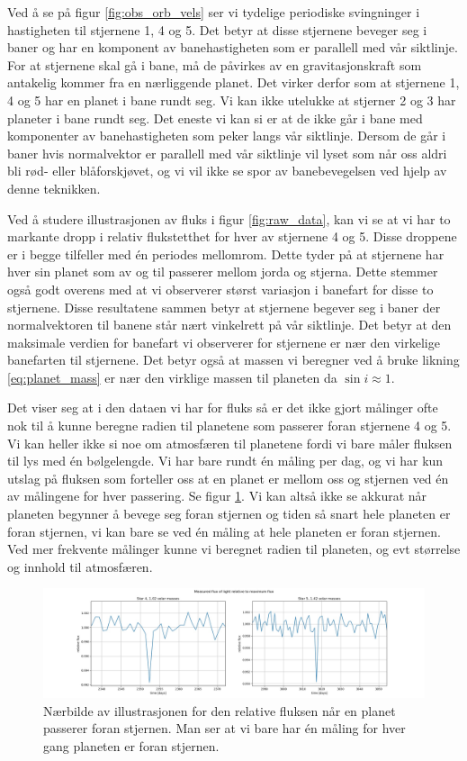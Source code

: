 \documentclass[english,notitlepage]{revtex4-1}  %
\begin{document}
Ved å se på figur \ref{fig:obs_orb_vels} ser vi tydelige periodiske svingninger i
 hastigheten til stjernene 1, 4 og 5. Det betyr at disse stjernene beveger seg i baner og
 har en komponent av banehastigheten som er parallell med vår siktlinje. For at stjernene skal gå i bane, må de påvirkes av en gravitasjonskraft som antakelig kommer fra en
 nærliggende planet. Det virker derfor som at stjernene 1, 4 og 5 har en planet i bane
 rundt seg. Vi kan ikke utelukke at stjerner 2 og 3 har planeter i bane rundt seg. Det
 eneste vi kan si er at de ikke går i bane med komponenter av banehastigheten som peker
 langs vår siktlinje. Dersom de går i baner hvis normalvektor er parallell med vår
 siktlinje vil lyset som når oss aldri bli rød- eller blåforskjøvet, og vi vil ikke se
 spor av banebevegelsen ved hjelp av denne teknikken.

Ved å studere illustrasjonen av fluks i figur \ref{fig:raw_data}, kan vi se at vi har to
 markante dropp i relativ flukstetthet for hver av stjernene 4 og 5. Disse droppene er i begge tilfeller med én periodes mellomrom. Dette tyder på at stjernene har hver sin planet som av og til passerer mellom jorda og stjerna. Dette stemmer også godt overens med at vi observerer størst variasjon i banefart for disse to stjernene. Disse resultatene sammen betyr at stjernene begever seg i baner der normalvektoren til banene står nært vinkelrett på vår siktlinje. Det betyr at den maksimale verdien for banefart vi observerer for stjernene er nær den virkelige banefarten til stjernene. Det betyr også at massen vi beregner ved å bruke likning \ref{eq:planet_mass} er nær den virklige massen til planeten da $\sin{i} \approx 1$.

Det viser seg at i den dataen vi har for fluks så er det ikke gjort målinger ofte nok
 til å kunne beregne radien til planetene som passerer foran stjernene 4 og 5. Vi kan heller ikke si noe om atmosfæren til planetene fordi vi bare måler fluksen til lys med én bølgelengde. Vi har bare rundt én måling per dag, og vi har kun utslag på fluksen som forteller oss at en planet er mellom oss og stjernen ved én av målingene for hver passering. Se figur \ref{fig:eclipse}. Vi kan altså ikke se akkurat når planeten begynner å bevege seg foran stjernen og tiden så snart hele planeten er foran stjernen, vi kan bare se ved én måling at hele planeten er foran stjernen. Ved mer frekvente målinger kunne vi beregnet radien til planeten, og evt størrelse og innhold til atmosfæren.

\begin{figure}
  \includegraphics[width=\linewidth]{../output/plots/eclipse.jpg}
  \caption{Nærbilde av illustrasjonen for den relative fluksen når en planet passerer foran stjernen. Man ser at vi bare har én måling for hver gang planeten er foran stjernen.}
  \label{fig:eclipse}
\end{figure}
\end{document}
